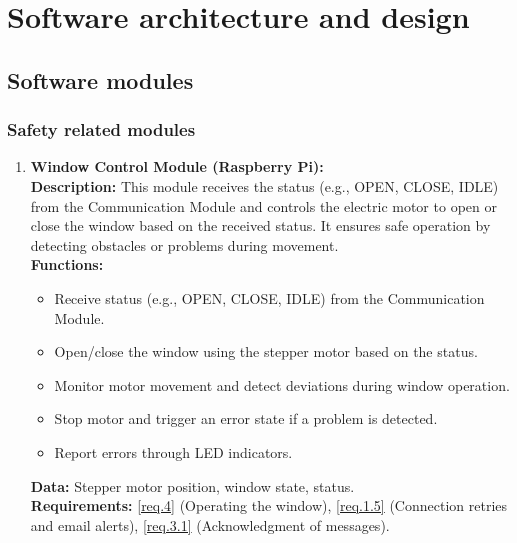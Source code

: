 \section{Software architecture and design}
\label{chapter2}

\subsection{Software modules}

\subsubsection{Safety related modules}
\begin{enumerate}
    \item \textbf{Window Control Module (Raspberry Pi):} \\ 
        \textbf{Description:} This module receives the status (e.g., OPEN, CLOSE, IDLE) from the Communication Module and controls the electric motor to open or close the window based on the received status. It ensures safe operation by detecting obstacles or problems during movement. \\ 
        \textbf{Functions:}
        \begin{itemize}
            \item Receive status (e.g., OPEN, CLOSE, IDLE) from the Communication Module.
            \item Open/close the window using the stepper motor based on the status.
            \item Monitor motor movement and detect deviations during window operation.
            \item Stop motor and trigger an error state if a problem is detected.
            \item Report errors through LED indicators.
        \end{itemize}
        \textbf{Data:} Stepper motor position, window state, status. \\ 
        \textbf{Requirements:} \ref{req.4} (Operating the window), \ref{req.1.5} (Connection retries and email alerts), \ref{req.3.1} (Acknowledgment of messages).
        

\end{enumerate}
